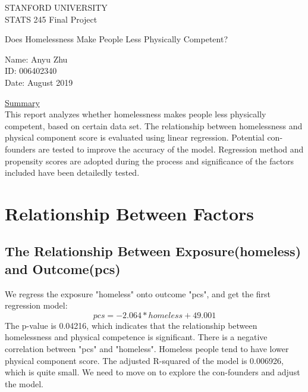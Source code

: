 \documentclass{report}
\begin{document}
	
\begin{titlepage} 			
\centering						
\vspace*{\fill}					
										
\huge{STANFORD UNIVERSITY}\\	
\vspace{1 cm}
\LARGE{STATS 245 Final Project}
\vspace{2 cm}
\begin{mdframed}					
\centering
\LARGE{Does Homelessness Make People Less Physically Competent?}
\end{mdframed}

\vspace{3 cm}

\begin{flushleft}
\large{Name: Anyu Zhu\\			
ID: 006402340 \\
Date: August 2019\\}

\vspace{3 cm}
\underline{Summary}\\[0.2in]
This report analyzes whether homelessness makes people less physically competent, based on certain data set. The relationship between homelessness and physical component score is evaluated using linear regression. Potential con-founders are tested to improve the accuracy of the model. Regression method and propensity scores are adopted during the process and significance of the factors included have been detailedly tested.
\vspace*{\fill}	
\end{flushleft}
\end{titlepage}						

\section{Relationship Between Factors}

\subsection{The Relationship Between Exposure(homeless) and Outcome(pcs)}
We regress the exposure "homeless" onto outcome "pcs", and get the first regression model:
\[pcs = -2.064 * homeless + 49.001\]
The p-value is 0.04216, which indicates that the relationship between homelessness and physical competence is significant. There is a negative correlation between "pcs" and "homeless". Homeless people tend to have lower physical component score. The adjusted R-squared of the model is 0.006926, which is quite small. We need to move on to explore the con-founders and adjust the model.
\end{document}

